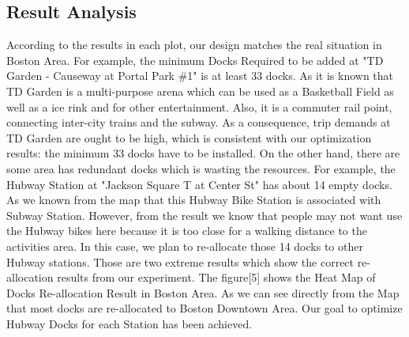\documentclass[journal, letterpaper]{IEEEtran}
\begin{document}
\subsection{Result Analysis}
According to the results in each plot, our design matches the real situation in Boston Area. For example, the minimum Docks Required to be added at "TD Garden - Causeway at Portal Park \#1" is at least 33 docks. As it is known that TD Garden is a multi-purpose arena which can be used as a Basketball Field as well as a ice rink and for other entertainment. Also, it is a commuter rail point, connecting inter-city trains and the subway. As a consequence, trip demands at TD Garden are ought to be high, which is consistent with our optimization results: the minimum 33 docks have to be installed. On the other hand, there are some area has redundant docks which is wasting the resources. For example, the Hubway Station at "Jackson Square T at Center St" has about 14 empty docks. As we known from the map that this Hubway Bike Station is associated with Subway Station. However, from the result we know that people may not want use the Hubway bikes here because it is too close for a walking distance to the activities area. In this case, we plan to re-allocate those 14 docks to other Hubway stations. Those are two extreme results which show the correct re-allocation results from our experiment. The figure[5] shows the Heat Map of Docks Re-allocation Result in Boston Area. As we can see directly from the Map that most docks are re-allocated to Boston Downtown Area. Our goal to optimize Hubway Docks for each Station has been achieved.

\end{document}
